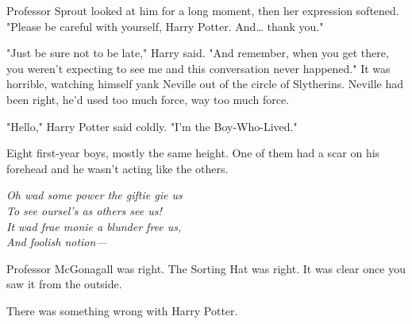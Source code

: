 Professor Sprout looked at him for a long moment, then her expression softened. 
"Please be careful with yourself, Harry Potter. And{\ldots} thank you."

"Just be sure not to be late," Harry said. "And remember, when you get there, 
you weren't expecting to see me and this conversation never happened."
\sbreak
It was horrible, watching himself yank Neville out of the circle of Slytherins. 
Neville had been right, he'd used too much force, way too much force.

"Hello," Harry Potter said coldly. "I'm the Boy-Who-Lived."

Eight first-year boys, mostly the same height. One of them had a scar on his 
forehead and he wasn't acting like the others.

\emph{Oh wad some power the giftie gie us\\
To see oursel's as others see us!\\
It wad frae monie a blunder free us,\\
And foolish notion---}

Professor McGonagall was right. The Sorting Hat was right. It was clear once 
you saw it from the outside.

There was something wrong with Harry Potter.
